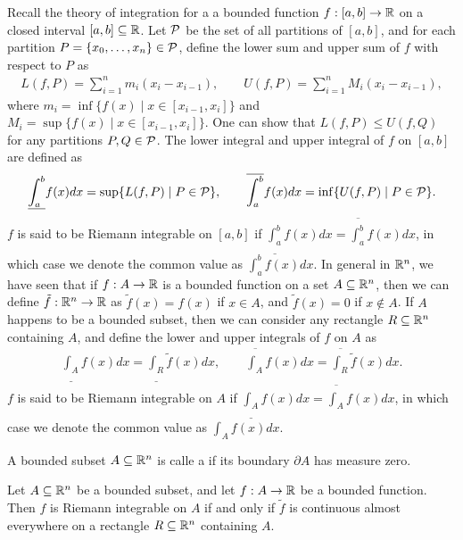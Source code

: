 Recall the theory of integration for a a bounded function $f:[a,b] \to \mathbb{R}$ on a closed interval $[a,b] \subseteq \mathbb{R}$. Let $\mathcal{P}$ be the set of all partitions of $[a,b]$, and for each partition $P = \{x_{0},\ldots,x_{n}\} \in \mathcal{P}$, define the lower sum and upper sum of $f$ with respect to $P$ as
\begin{align}
    L(f,P) = \sum_{i=1}^{n} m_{i}(x_{i}-x_{i-1}), \qquad U(f,P) = \sum_{i=1}^{n} M_{i}(x_{i}-x_{i-1}),
\end{align}
where $m_{i} = \inf\{f(x) \mid x \in [x_{i-1},x_{i}]\}$ and $M_{i} = \sup\{f(x) \mid x \in [x_{i-1},x_{i}]\}$. One can show that $L(f,P) \leq U(f,Q)$ for any partitions $P,Q \in \mathcal{P}$. The lower integral and upper integral of $f$ on $[a,b]$ are defined as
\begin{align}
    \underline{\int_{a}^{b}} f(x) dx = \sup\{L(f,P) \mid P \in \mathcal{P}\}, \qquad \overline{\int_{a}^{b}} f(x) dx = \inf\{U(f,P) \mid P \in \mathcal{P}\}.
\end{align}
$f$ is said to be Riemann integrable on $[a,b]$ if $\underline{\int_{a}^{b}} f(x) dx = \overline{\int_{a}^{b}} f(x) dx$, in which case we denote the common value as $\int_{a}^{b} f(x) dx$. In general in $\mathbb{R}^{n}$, we have seen that if $f:A \to \mathbb{R}$ is a bounded function on a set $A \subseteq \mathbb{R}^{n}$, then we can define $\tilde{f}:\mathbb{R}^{n} \to \mathbb{R}$ as $\tilde{f}(x) = f(x)$ if $x \in A$, and $\tilde{f}(x) = 0$ if $x \notin A$. If $A$ happens to be a bounded subset, then we can consider any rectangle $R \subseteq \mathbb{R}^{n}$ containing $A$, and define the lower and upper integrals of $f$ on $A$ as
\begin{align}
    \underline{\int_{A}} f(x) dx = \underline{\int_{R}} \tilde{f}(x) dx, \qquad \overline{\int_{A}} f(x) dx = \overline{\int_{R}} \tilde{f}(x) dx.
\end{align}
$f$ is said to be Riemann integrable on $A$ if $\underline{\int_{A}} f(x) dx = \overline{\int_{A}} f(x) dx$, in which case we denote the common value as $\int_{A} f(x) dx$. 

A bounded subset $A \subseteq \mathbb{R}^{n}$ is calle a  if its boundary $\partial A$ has measure zero.

\begin{lemma}
    Let $A \subseteq \mathbb{R}^{n}$ be a bounded subset, and let $f:A \to \mathbb{R}$ be a bounded function. Then $f$ is Riemann integrable on $A$ if and only if $\tilde{f}$ is continuous almost everywhere on a rectangle $R \subseteq \mathbb{R}^{n}$ containing $A$.
    
\end{lemma}

